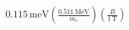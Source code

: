\begin{align*}
  0.115\,\mathrm{meV}
  \left( \frac{0.511\,\mathrm{MeV}}{m_e} \right)
  \left( \frac{B}{1\,\mathrm{T}} \right)
\end{align*}
